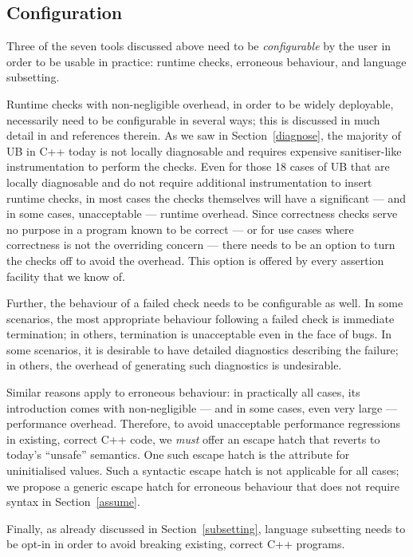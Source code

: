 {\subsection{Configuration}
\label{config}

Three of the seven tools discussed above need to be \emph{configurable} by the user in order to be usable in practice: runtime checks, erroneous behaviour, and language subsetting.

Runtime checks with non-negligible overhead, in order to be widely deployable, necessarily need to be configurable in several ways; this is discussed in much detail in \cite{P2899R1} and references therein. As we saw in Section~\ref{diagnose}, the majority of UB in C++ today is not locally diagnosable and requires expensive sanitiser-like instrumentation to perform the checks. Even for those 18 cases of UB that are locally diagnosable and do not require additional instrumentation to insert runtime checks, in most cases the checks themselves will have a significant --- and in some cases, unacceptable --- runtime overhead. Since correctness checks serve no purpose in a program known to be correct --- or for use cases where correctness is not the overriding concern ---  there needs to be an option to turn the checks off to avoid the overhead. This option is offered by every assertion facility that we know of. 

Further, the behaviour of a failed check needs to be configurable as well. In some scenarios, the most appropriate behaviour following a failed check is immediate termination; in others, termination is unacceptable even in the face of bugs. In some scenarios, it is desirable to have detailed diagnostics describing the failure; in others, the overhead of generating such diagnostics is undesirable.

Similar reasons apply to erroneous behaviour: in practically all cases, its introduction comes with non-negligible --- and in some cases, even very large --- performance overhead. Therefore, to avoid unacceptable performance regressions in existing, correct C++ code, we \emph{must} offer an escape hatch that reverts to today's ``unsafe'' semantics. One such escape hatch is the \tcode{[[indeterminate]]} attribute for uninitialised values. Such a syntactic escape hatch is not applicable for all cases; we propose a generic escape hatch for erroneous behaviour that does not require syntax in  Section~\ref{assume}.

Finally, as already discussed in Section~\ref{subsetting}, language subsetting needs to be opt-in in order to avoid breaking existing, correct C++ programs.

}
